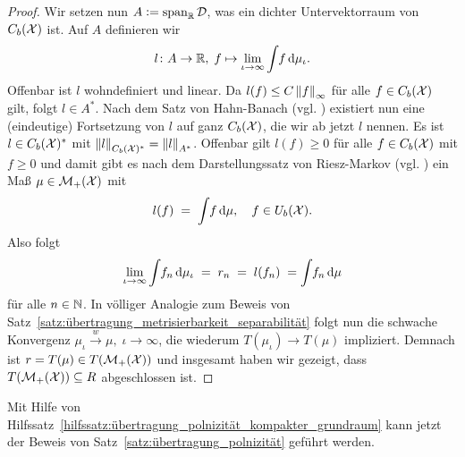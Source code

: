 \documentclass[../main/main.tex]{subfiles}
\begin{document}
\begin{proof}
		Wir setzen nun $A \vcentcolon = \mathrm{span}_{\mathbb{R}} \, \mathcal{D}$, was ein dichter Untervektorraum von $C_b(\mathcal{X})$ ist. Auf $A$ definieren wir
		\[ l \colon A \to \mathbb{R}, \; f \mapsto \lim_{\iota \to \infty} \int_{} \, f \, \mathrm{d}\mu_\iota  \text{.} \]
		Offenbar ist $l$ wohndefiniert und linear. Da $l(f) \leq C \left\lVert f\right\rVert_\infty$ für alle $f \in C_b(\mathcal{X})$ gilt, folgt $l \in A^\ast$. Nach dem Satz von Hahn-Banach (vgl. \cite[Folgerung 5.5.2]{Simon.2015})
		existiert nun eine (eindeutige) Fortsetzung von $l$ auf ganz $C_b(\mathcal{X})$, die wir ab jetzt $l$ nennen. Es ist $l \in C_b(\mathcal{X})^\ast$ 
		mit $\left\lVert l\right\rVert_{C_b(\mathcal{X})^\ast} = \left\lVert l\right\rVert_{A^\ast}$. Offenbar gilt $l(f) \geq 0$ für alle $f \in C_b(\mathcal{X})$ mit $f \geq 0$ und damit gibt es 
		nach dem Darstellungssatz von Riesz-Markov (vgl. \cite[Satz 4.8.8]{Simon.2015}) ein Maß $\mu \in \mathcal{M}_{+}(\mathcal{X})$ mit 
		\[ l(f) \; = \; \int_{} \, f \, \mathrm{d}\mu, \quad f \in U_b(\mathcal{X}) \text{.} \]
		Also folgt
		\[ \lim_{\iota \to \infty} \int_{} \, f_n \, \mathrm{d}\mu_\iota \; = \; r_n \; = \; l(f_n) \; = \int_{} \, f_n \, \mathrm{d}\mu \]
		für alle $n \in \mathbb{N}$. In völliger Analogie zum Beweis von Satz~\ref{satz:übertragung_metrisierbarkeit_separabilität} folgt nun die schwache Konvergenz $\mu_\iota \xrightarrow{w} \mu, \; \iota \to \infty$,
		die wiederum $T(\mu_\iota) \to T(\mu)$ impliziert. Demnach ist $r = T(\mu) \in T(\mathcal{M}_{+}(\mathcal{X}))$ und insgesamt haben wir gezeigt, dass $T(\mathcal{M}_{+}(\mathcal{X})) \subseteq R$ abgeschlossen ist.
	\end{proof}

	Mit Hilfe von Hilfssatz~\ref{hilfssatz:übertragung_polnizität_kompakter_grundraum} kann jetzt der Beweis von Satz~\ref{satz:übertragung_polnizität} geführt werden.
\end{document}
